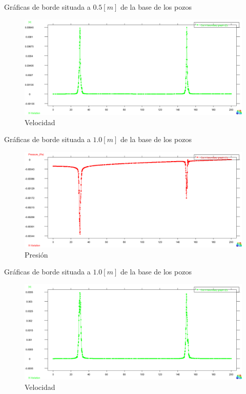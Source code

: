 \documentclass[spanish]{beamer}
\begin{document}
%
%
\begin{frame}{Gráficas de borde situada a $0.5[m]$ de la base de los pozos}
\begin{center}
\begin{figure}[htbp]
\centerline{\includegraphics[scale=0.25]{../img/200m/grf/200_grafico_velocidad_x_centro_pozos_distancia05}}
\caption{Velocidad}
\end{figure}
\end{center}
\end{frame}
%
%
\begin{frame}{Gráficas de borde situada a $1.0[m]$ de la base de los pozos}
\begin{center}
\begin{figure}[htbp]
\centerline{\includegraphics[scale=0.25]{../img/200m/grf/200_grafico_presion_x_centro_pozos_distancia1}}
\caption{Presión}
\end{figure}
\end{center}
\end{frame}
%
%
\begin{frame}{Gráficas de borde situada a $1.0[m]$ de la base de los pozos}
\begin{center}
\begin{figure}[htbp]
\centerline{\includegraphics[scale=0.25]{../img/200m/grf/200_grafico_velocidad_x_centro_pozos_distancia1}}
\caption{Velocidad}
\end{figure}
\end{center}
\end{frame}
%
\end{document}
